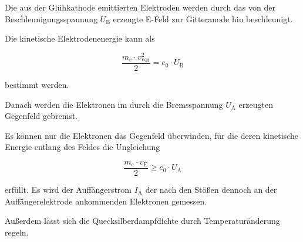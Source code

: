 Die aus der Glühkathode emittierten Elektroden werden durch das von der
Beschleunigungsspannung $U_\text{B}$ erzeugte E-Feld zur Gitteranode hin
beschleunigt.

Die kinetische Elektrodenenergie kann als

\begin{equation}
    \frac{m_e \cdot v_\text{vor}^2}{2} = e_0 \cdot U_\text{B}
\end{equation}

bestimmt werden.

Danach werden die Elektronen im durch die Bremsspannung $U_\text{A}$ erzeugten
Gegenfeld gebremst. 

Es können nur die Elektronen das Gegenfeld überwinden, für die deren kinetische
Energie entlang des Feldes die Ungleichung

\begin{equation}
    \frac{m_e \cdot v_\text{E}}{2} \geq e_0 \cdot U_\text{A}
\end{equation}

erfüllt.
Es wird der Auffängerstrom $I_\text{A}$ der nach den Stößen dennoch an der Auffängerelektrode ankommenden
Elektronen gemessen.

Außerdem lässt sich die Quecksilberdampfdichte durch Temperaturänderung regeln.


